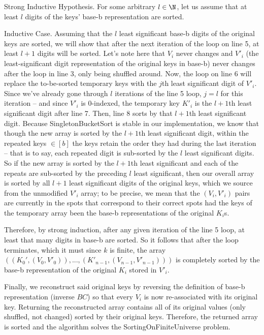 \documentclass[11pt]{article}
\begin{document}
\begin{enumerate}
\begin{enumerate}
            \bigskip
            
            Strong Inductive Hypothesis. For some arbitrary $l\in\N$, let us assume that at least $l$ digits of the keys' base-b representation are sorted.
            
            \bigskip
            
            Inductive Case. Assuming that the $l$ least significant base-b digits of the original keys are sorted, we will show that after the next iteration of the loop on line 5, at least $l+1$ digits will be sorted. Let's note here that $V_i$ never changes and $V'_i$ (the least-significant digit representation of the original keys in base-b) never changes after the loop in line 3, only being shuffled around. Now, the loop on line 6 will replace the to-be-sorted temporary keys with the $j$th least significant digit of $V'_i$. Since we've already gone through $l$ iterations of the line 5 loop, $j=l$ for this iteration -- and since $V'_i$ is 0-indexed, the temporary key $K'_i$ is the $l+1$th least significant digit after line 7. Then, line 8 sorts by that $l+1$th least significant digit. Because SingletonBucketSort is stable in our implementation, we know that though the new array is sorted by the $l+1$th least significant digit, within the repeated keys $\in[b]$ the keys retain the order they had during the last iteration -- that is to say, each repeated digit is sub-sorted by the $l$ least significant digits. So if the new array is sorted by the $l+1$th least significant and each of the repeats are sub-sorted by the preceding $l$ least significant, then our overall array is sorted by all $l+1$ least significant digits of the original keys, which we source from the unmodified $V'_i$ array; to be precise, we mean that the $(V_i, V'_i)$ pairs are currently in the spots that correspond to their correct spots had the keys of the temporary array been the base-b representations of the original $K_i$s.
            
            \bigskip
            
            Therefore, by strong induction, after any given iteration of the line 5 loop, at least that many digits in base-b are sorted. So it follows that after the loop terminates, which it must since $k$ is finite, the array $((K_0', (V_0, V'_0)), ..., (K'_{n-1}, (V_{n-1}, V'_{n-1})))$ is completely sorted by the base-b representation of the original $K_i$ stored in $V'_i$.
            
            Finally, we reconstruct said original keys by reversing the definition of base-b representation (inverse $BC$) so that every $V_i$ is now re-associated with its original key. Returning the reconstructed array contains all of its original values (only shuffled, not changed) sorted by their original keys. Therefore, the returned array is sorted and the algorithm solves the SortingOnFiniteUniverse problem.
            

\end{enumerate}
\end{enumerate}
\end{document}
